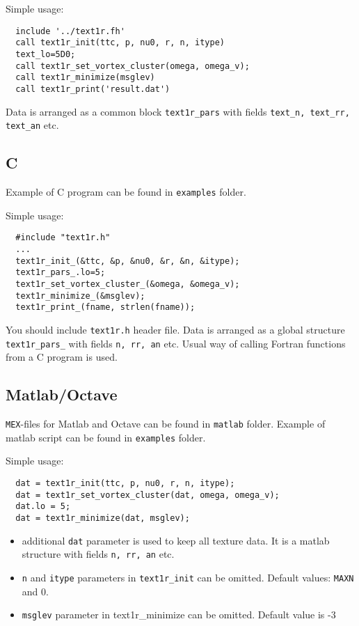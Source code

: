\documentclass[a4paper]{article}
\begin{document}
Simple usage:
\begin{verbatim}
  include '../text1r.fh'
  call text1r_init(ttc, p, nu0, r, n, itype)
  text_lo=5D0;
  call text1r_set_vortex_cluster(omega, omega_v);
  call text1r_minimize(msglev)
  call text1r_print('result.dat')
\end{verbatim}

Data is arranged as a common block {\tt text1r\_pars} with
fields {\tt text\_n, text\_rr, text\_an} etc.

\subsection*{C}
Example of C program can be found in {\tt examples} folder.

Simple usage:
\begin{verbatim}
  #include "text1r.h"
  ...
  text1r_init_(&ttc, &p, &nu0, &r, &n, &itype);
  text1r_pars_.lo=5;
  text1r_set_vortex_cluster_(&omega, &omega_v);
  text1r_minimize_(&msglev);
  text1r_print_(fname, strlen(fname));
\end{verbatim}

You should include {\tt text1r.h} header file. Data is arranged as a
global structure {\tt text1r\_pars\_} with fields {\tt n, rr, an} etc. Usual
way of calling Fortran functions from a C program is used.

\subsection*{Matlab/Octave}
{\tt MEX}-files for Matlab and Octave can be found in {\tt matlab} folder.
Example of matlab script can be found in {\tt examples} folder.

Simple usage:
\begin{verbatim}
  dat = text1r_init(ttc, p, nu0, r, n, itype);
  dat = text1r_set_vortex_cluster(dat, omega, omega_v);
  dat.lo = 5;
  dat = text1r_minimize(dat, msglev);
\end{verbatim}

\begin{itemize}
\item additional {\tt dat} parameter is used to keep all texture data. It
is a matlab structure with fields {\tt n, rr, an} etc.

\item {\tt n} and {\tt itype} parameters in {\tt text1r\_init} can be omitted.
Default values: {\tt MAXN} and 0.

\item {\tt msglev} parameter in {text1r\_minimize} can be omitted.
Default value is -3

\end{itemize}
\end{document}
